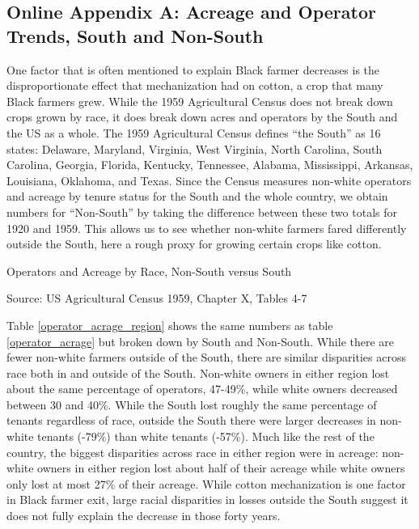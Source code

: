 \documentclass[12pt]{article}
\begin{document}
\newpage
\begin{appendix}
\section*{Online Appendix A: Acreage and Operator Trends, South and Non-South}

One factor that is often mentioned to explain Black farmer decreases is the disproportionate effect that mechanization had on cotton, a crop that many Black farmers grew. While the 1959 Agricultural Census does not break down crops grown by race, it does break down acres and operators by the South and the US as a whole. The 1959 Agricultural Census defines “the South” as 16 states: Delaware, Maryland, Virginia, West Virginia, North Carolina, South Carolina, Georgia, Florida, Kentucky, Tennessee, Alabama, Mississippi, Arkansas, Louisiana, Oklahoma, and Texas. Since the Census measures non-white operators and acreage by tenure status for the South and the whole country, we obtain numbers for “Non-South” by taking the difference between these two totals for 1920 and 1959. This allows us to see whether non-white farmers fared differently outside the South, here a rough proxy for growing certain crops like cotton. 


\begin{table}
\caption{Operators and Acreage by Race, Non-South versus South}
\label{operator_acrage_region}
\centering
\footnotesize

\normalsize

Source: US Agricultural Census 1959, Chapter X, Tables 4-7
\end{table}


Table \ref{operator_acrage_region} shows the same numbers as table \ref{operator_acrage} but broken down by South and Non-South. While there are fewer non-white farmers outside of the South, there are similar disparities across race both in and outside of the South. Non-white owners in either region lost about the same percentage of operators, 47-49\%, while white owners decreased between 30 and 40\%. While the South lost roughly the same percentage of tenants regardless of race, outside the South there were larger decreases in non-white tenants (-79\%) than white tenants (-57\%). Much like the rest of the country, the biggest disparities across race in either region were in acreage: non-white owners in either region lost about half of their acreage while white owners only lost at most 27\% of their acreage. While cotton mechanization is one factor in Black farmer exit, large racial disparities in losses outside the South suggest it does not fully explain the decrease in those forty years.

\end{appendix}
\end{document}
